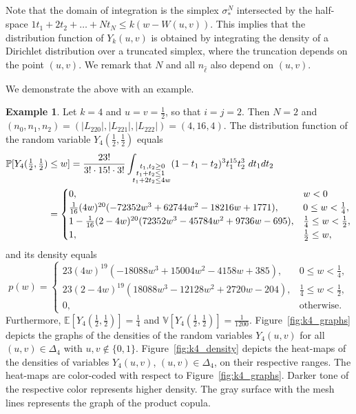 \documentclass[12pt,a4paper]{amsart}
\theoremstyle{definition}
\newtheorem{example}[theorem]{Example}
\newcommand{\PP}{\mathbb{P}}
\newcommand{\EE}{\mathbb{E}}
\newcommand{\VV}{\mathbb{V}}
\newcommand{\hell}{\hat{\ell}}
\begin{document}
Note that the domain of integration is the simplex $\sigma_*^N$ intersected by the half-space $1t_1+2t_2+\ldots+Nt_N \le k(w-W(u,v))$. This implies that the distribution function of $Y_k(u,v)$ is obtained by integrating the density of a Dirichlet distribution over a truncated simplex, where the truncation depends on the point $(u,v)$. We remark that $N$ and all $n_{\hell}$ also depend on $(u,v)$.

\medskip

We demonstrate the above with an example.

\begin{example} Let $k=4$ and $u=v=\frac12$, so that $i=j=2$. Then $N=2$ and $(n_0,n_1,n_2)=(|L_{220}|,|L_{221}|,|L_{222}|)=(4,16,4)$. The distribution function of the random variable $Y_4(\frac12,\frac12)$ equals
\begin{align*}
    \PP[Y_4(\tfrac12,\tfrac12) &\le w] =\frac{23!}{3! \cdot 15! \cdot 3!} \int_{\substack{\hspace{0.06cm} t_1, t_2 \ge 0\\ t_1+t_2 \le 1 \hspace{0.08cm}\\ t_1+2t_2\le 4w}} (1-t_1-t_2)^{3} t_1^{15} t_2^{3} ~dt_1 dt_2\\
    &=\begin{cases}
        0, & w<0\\
        \tfrac{1}{16} (4 w)^{20} (-72352 w^3+62744 w^2-18216 w+1771), & 0 \le w<\tfrac14,\\
        1-\tfrac{1}{16} (2-4w)^{20} (72352 w^3-45784 w^2+9736 w-695), & \tfrac14 \le w<\tfrac12,\\
        1, & \tfrac12 \le w,
    \end{cases}
\end{align*}
and its density equals
$$p(w)=\begin{cases}
    23(4w)^{19} (-18088 w^3+15004 w^2-4158 w+385), & 0 \le w<\tfrac14,\\
    23(2-4w)^{19} (18088 w^3-12128 w^2+2720 w-204), & \tfrac14 \le w<\tfrac12,\\
    0, & \text{otherwise}.
\end{cases}$$
Furthermore, $\EE[Y_4(\tfrac12,\tfrac12)]=\tfrac14$ and $\VV[Y_4(\tfrac12,\tfrac12)]=\tfrac{1}{1200}$.
Figure~\ref{fig:k4_graphs} depicts the graphs of the densities of the random variables $Y_4(u,v)$ for all $(u,v) \in \Delta_4$ with $u,v \notin \{0,1\}$.
Figure~\ref{fig:k4_density} depicts the heat-maps of the densities of variables $Y_4(u,v)$, $(u,v) \in \Delta_4$, on their respective ranges. The heat-maps are color-coded with respect to Figure~\ref{fig:k4_graphs}. Darker tone of the respective color represents higher density. The gray surface with the mesh lines represents the graph of the product copula.


\end{example}
\end{document}
